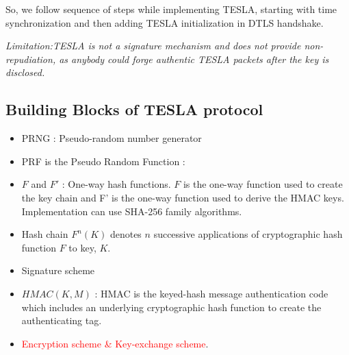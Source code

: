 So, we follow sequence of steps while implementing TESLA, starting with time synchronization and then adding TESLA initialization in DTLS handshake.

\textit{Limitation:TESLA is not a signature mechanism and does not provide non-repudiation, as anybody could forge authentic TESLA packets after the key is disclosed.}\\




\subsection{Building Blocks of TESLA protocol}

\begin{itemize}
\item PRNG : Pseudo-random number generator

\item PRF is the Pseudo Random Function :

\item $F$ and $F'$ : One-way hash functions. $F$ is the one-way function used to create the key chain and F' is the one-way function used to derive the HMAC keys. Implementation can use SHA-256 family algorithms.

\item Hash chain $F^{n}(K)$ denotes $n$ successive applications of cryptographic hash function $F$ to key, $K$.

\item Signature scheme 



\item $HMAC(K,M)$ : HMAC is the keyed-hash message authentication code which includes an underlying cryptographic hash function to create the authenticating tag.
\item \textcolor{red}{Encryption scheme \& Key-exchange scheme}.
\end{itemize}



